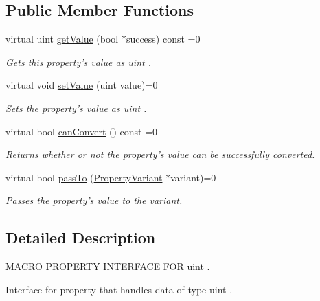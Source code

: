 \subsection*{Public Member Functions}
\begin{DoxyCompactItemize}
\item 
virtual uint \hyperlink{class_i_u_int_property_af3c17d292a74241f1d80b10be434edde}{get\-Value} (bool $\ast$success) const =0
\begin{DoxyCompactList}\small\item\em Gets this property's value as uint . \end{DoxyCompactList}\item 
virtual void \hyperlink{class_i_u_int_property_a2344d640892a4c3529bcca63c4c2531c}{set\-Value} (uint value)=0
\begin{DoxyCompactList}\small\item\em Sets the property's value as uint . \end{DoxyCompactList}\item 
virtual bool \hyperlink{class_i_u_int_property_a4fa6fa9ef5663109772bf51123323c87}{can\-Convert} () const =0
\begin{DoxyCompactList}\small\item\em Returns whether or not the property's value can be successfully converted. \end{DoxyCompactList}\item 
virtual bool \hyperlink{class_i_u_int_property_a1f1d04eae6cfa51bdd17157aa5dc348c}{pass\-To} (\hyperlink{class_property_variant}{Property\-Variant} $\ast$variant)=0
\begin{DoxyCompactList}\small\item\em Passes the property's value to the variant. \end{DoxyCompactList}\end{DoxyCompactItemize}


\subsection{Detailed Description}
M\-A\-C\-R\-O P\-R\-O\-P\-E\-R\-T\-Y I\-N\-T\-E\-R\-F\-A\-C\-E F\-O\-R uint . 

Interface for property that handles data of type uint . 

